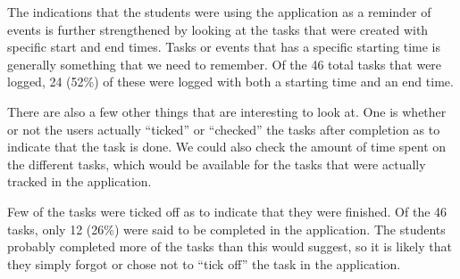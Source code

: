 The indications that the students were using the application as a reminder of events is further strengthened by looking at the tasks that were created with specific start and end times. Tasks or events that has a specific starting time is generally something that we need to remember. Of the 46 total tasks that were logged, 24 (52\%) of these were logged with both a starting time and an end time.

There are also a few other things that are interesting to look at. One is whether or not the users actually ``ticked'' or ``checked'' the tasks after completion as to indicate that the task is done. We could also check the amount of time spent on the different tasks, which would be available for the tasks that were actually tracked in the application.

Few of the tasks were ticked off as to indicate that they were finished. Of the 46 tasks, only 12 (26\%) were said to be completed in the application. The students probably completed more of the tasks than this would suggest, so it is likely that they simply forgot or chose not to ``tick off'' the task in the application.


